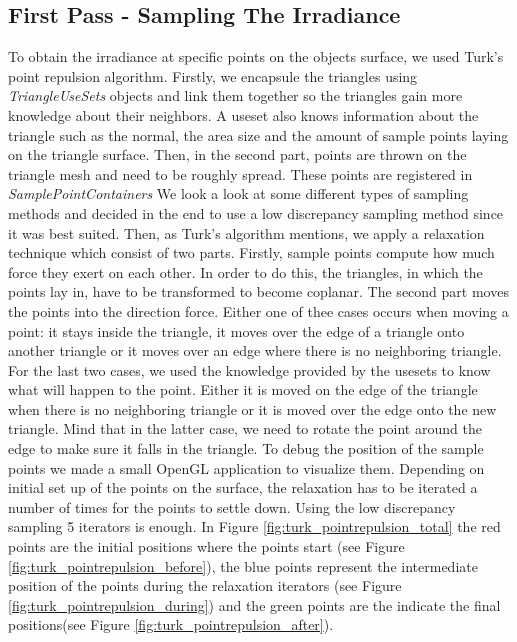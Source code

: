 \documentclass{article}
\begin{document}
\subsection{First Pass - Sampling The Irradiance}
To obtain the irradiance at specific points on the objects surface, we used Turk's point repulsion algorithm. Firstly, we encapsule the triangles using {\it TriangleUseSets} objects and link them together so the triangles gain more knowledge about their neighbors. A useset also knows information about the triangle such as the normal, the area size and the amount of sample points laying on the triangle surface. Then, in the second part, points are thrown on the triangle mesh and need to be roughly spread. These points are registered in {\it SamplePointContainers} We look a look at some different types of sampling methods and decided in the end to use a low discrepancy sampling method since it was best suited. Then, as Turk's algorithm mentions, we apply a relaxation technique which consist of two parts. Firstly, sample points compute how much force they exert on each other. In order to do this, the triangles, in which the points lay in, have to be transformed to become coplanar. The second part moves the points into the direction force. Either one of thee cases occurs when moving a point: it stays inside the triangle, it moves over the edge of a triangle onto another triangle or it moves over an edge where there is no neighboring triangle. For the last two cases, we used the knowledge provided by the usesets to know what will happen to the point. Either it is moved on the edge of the triangle when there is no neighboring triangle or it is moved over the edge onto the new triangle. Mind that in the latter case, we need to rotate the point around the edge to make sure it falls in the triangle. To debug the position of the sample points we made a small OpenGL application to visualize them. Depending on initial set up of the points on the surface, the relaxation has to be iterated a number of times for the points to settle down. Using the low discrepancy sampling 5 iterators is enough.
In Figure \ref{fig:turk_pointrepulsion_total} the red points are the initial positions where the points start (see Figure \ref{fig:turk_pointrepulsion_before}), the blue points represent the intermediate position of the points during the relaxation iterators (see Figure \ref{fig:turk_pointrepulsion_during}) and the green points are the indicate the final positions(see Figure \ref{fig:turk_pointrepulsion_after}).
\end{document}
